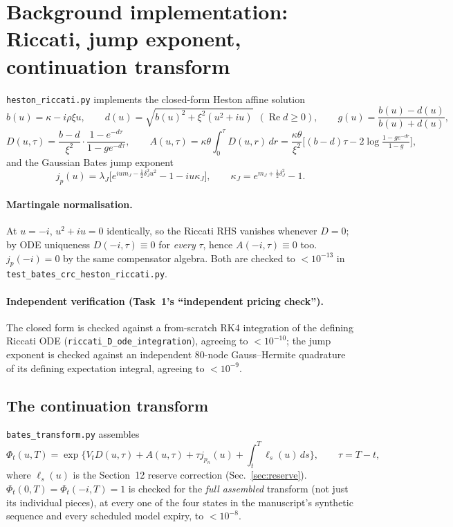 \section{Background implementation: Riccati, jump exponent, continuation transform}
\label{sec:background}

\texttt{heston\_riccati.py} implements the closed-form Heston affine
solution
\[
  b(u)=\kappa-i\rho\xi u,\qquad
  d(u)=\sqrt{b(u)^2+\xi^2(u^2+iu)}\ \ (\operatorname{Re}d\ge0),\qquad
  g(u)=\frac{b(u)-d(u)}{b(u)+d(u)},
\]
\[
  D(u,\tau)=\frac{b-d}{\xi^2}\cdot\frac{1-e^{-d\tau}}{1-ge^{-d\tau}},\qquad
  A(u,\tau)=\kappa\theta\!\int_0^\tau\! D(u,r)\,dr
           =\frac{\kappa\theta}{\xi^2}\Big[(b-d)\tau-2\log\tfrac{1-ge^{-d\tau}}{1-g}\Big],
\]
and the Gaussian Bates jump exponent
\[
  j_p(u)=\lambda_J\Big[e^{ium_J-\tfrac12\delta_J^2u^2}-1-iu\kappa_J\Big],\qquad
  \kappa_J=e^{m_J+\tfrac12\delta_J^2}-1.
\]

\paragraph{Martingale normalisation.} At $u=-i$, $u^2+iu=0$ identically, so
the Riccati RHS vanishes whenever $D=0$; by ODE uniqueness $D(-i,\tau)\equiv0$
for \emph{every} $\tau$, hence $A(-i,\tau)\equiv0$ too. $j_p(-i)=0$ by the same
compensator algebra. Both are checked to $<10^{-13}$ in
\texttt{test\_bates\_crc\_heston\_riccati.py}.

\paragraph{Independent verification (Task~1's ``independent pricing
check'').} The closed form is checked against a from-scratch RK4 integration
of the defining Riccati ODE (\texttt{riccati\_D\_ode\_integration}), agreeing
to $<10^{-10}$; the jump exponent is checked against an independent 80-node
Gauss--Hermite quadrature of its defining expectation integral, agreeing to
$<10^{-9}$.

\subsection{The continuation transform}
\label{sec:continuation-transform}

\texttt{bates\_transform.py} assembles
\[
  \Phi_t(u,T)=\exp\Big\{V_tD(u,\tau)+A(u,\tau)+\tau j_{p_n}(u)
              +\int_t^T\ell_s(u)\,ds\Big\},\qquad \tau=T-t,
\]
where $\ell_s(u)$ is the Section~12 reserve correction (Sec.~\ref{sec:reserve}).
$\Phi_t(0,T)=\Phi_t(-i,T)=1$ is checked for the \emph{full assembled}
transform (not just its individual pieces), at every one of the four states
in the manuscript's synthetic sequence and every scheduled model expiry, to
$<10^{-8}$.

